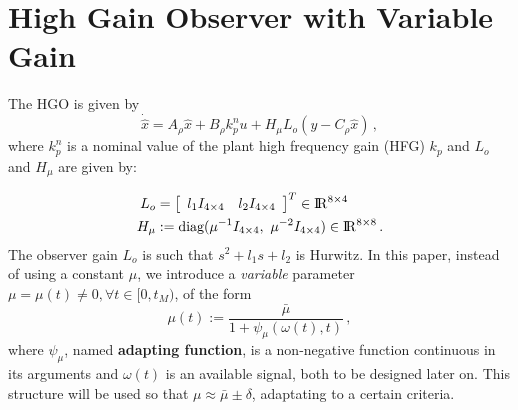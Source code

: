 \documentclass[letterpaper, 10 pt, conference]{ieeeconf}  %
\def\re{{\rm I}\! {\rm R}}
\theoremstyle{plain}
\theoremstyle{definition}
\theoremstyle{remark}
\newtheorem*{remark}{Remark}
\begin{document}
\section{High Gain Observer with Variable Gain}
\label{sec:HGO}

The HGO \cite{Khalil2008} is given by
%
\begin{equation}
\dot{\hat{x}}=A_\rho \hat{x} +  B_\rho k_p^n u +H_\mu L_o (y-C_\rho
\hat{x})\,,\label{eq:reducedHGO}
\end{equation}
%
where $k_p^n$ is a nominal value of the plant high frequency gain (HFG) $k_p$ and $L_o$ and $H_\mu$ are given by:

%
\begin{subequations}
	\label{eq:defLhgo_and_Hhgo}
	\begin{align}
		L_o &= \left[\begin{array}{cc}  l_1 I_{4 \times 4} & l_2 I_{4 \times 4} \end{array} \right]^T \in \re^{8 \times 4} 
		\\
		H_\mu &:= \mbox{diag}(\mu^{-1}  I_{4 \times 4}, \ \mu^{-2} I_{4 \times 4}) \in \re^{8 \times 8}\,.
	\end{align}
\end{subequations}
%
%
%
The observer gain $L_o$ is such that $s^{2}+l_1
s+ l_2$ is Hurwitz. In this paper,
instead of using a constant $\mu$, we introduce a {\em variable}
parameter $\mu=\mu(t)\neq\!0, \forall t\in[0,t_M)$, %
of the form
%
\begin{equation}
\mu(t):=\frac{\bar{\mu}}{1+
\psi_\mu(\omega(t),t)}\,,\label{eq:def_mu}
\end{equation}
%
where $\psi_\mu$, named \textbf{adapting function}, is a
non-negative function continuous in its
arguments and $\omega(t)$ is an available signal, both to be designed later on. This structure will be used so that $\mu \approx \bar{\mu} \pm \delta$, adaptating to a certain criteria.
\end{document}
